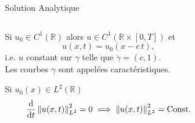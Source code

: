 \documentclass[aspectratio=169, french]{beamer}
\newcommand{\bbR}{\mathbb{R}}
\newcommand*{\norm}[1]{\ensuremath{\left\|#1\right\|}}
\begin{document}
\begin{frame}{Solution Analytique}
	\begin{columns}
	\begin{column}{.58\textwidth}
		\begin{overlayarea}{\textwidth}{\textheight}
		\vspace{.2cm}
		\begin{tcolorbox}[title = Solution analytique regulière, coltitle=white]
			Si $u_0 \in C^{1}(\bbR)$ alors  
			$u \in C^{1}(\bbR \times[0, T])$ et
			\begin{equation*}
				u(x, t) = 	u_0(x - c\, t),
			\end{equation*}
		i.e. $u$ constant sur $\gamma$ telle que $\dot{\gamma} = (c ,1)$. \\
		Les courbes $\gamma$ sont appelées caractéristiques.
		\end{tcolorbox}
		\vspace{.2cm}
		\begin{tcolorbox}[title = Conservation de l'energie, coltitle=white]
			Si $u_0(x) \in L^2(\bbR)$
			\begin{equation*}
				\diff{}{t}\norm{u(x, t)}_{L^2}^2 = 0 \implies \norm{u(x, t)}^2_{L^2} = \mathrm{Const}.
			\end{equation*}
		\end{tcolorbox}
		\end{overlayarea}
	\end{column}
	\begin{column}{.42\textwidth}
		\begin{overlayarea}{\textwidth}{\textheight}
		\begin{figure}[t]
\end{figure}
\end{overlayarea}
\end{column}
\end{columns}
\end{frame}
\end{document}
